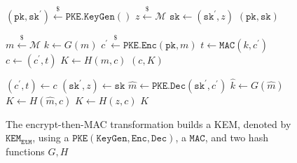 \documentclass[runningheads]{llncs}
\newcommand{\pke}{\texttt{PKE}}
\newcommand{\keygen}{\texttt{KeyGen}}
\newcommand{\encrypt}{\texttt{Enc}}
\newcommand{\decrypt}{\texttt{Dec}}
\newcommand{\kem}{\texttt{KEM}}
\newcommand{\encap}{\texttt{Encap}}
\newcommand{\decap}{\texttt{Decap}}
\newcommand{\etm}{\texttt{EtM}}  %
\newcommand{\mac}{\texttt{MAC}}
\newcommand{\pk}{\texttt{pk}}
\newcommand{\sk}{\texttt{sk}}
\newcommand{\leftsample}{\stackrel{\$}{\leftarrow}}
\begin{document}
\begin{figure}[H]
    \centering
    \begin{minipage}[t]{0.5\textwidth}
        \begin{algorithm}[H]
            \caption*{$\kem_\etm.\keygen()$}
            \begin{algorithmic}[1]
                \State $(\pk, \sk^\prime) \leftsample \pke\texttt{.}\keygen()$
                \State $z \leftsample \mathcal{M}$
                \State $\sk \leftarrow (\sk^\prime, z)$
                \State \Return $(\pk, \sk)$
            \end{algorithmic}
        \end{algorithm}
        \begin{algorithm}[H]
            \caption*{$\kem_\etm.\encap(\pk)$}
            \begin{algorithmic}[1]
                \State $m \leftsample \mathcal{M}$
                \State $k \leftarrow G(m)$
                \State $c^\prime \leftsample \pke\texttt{.}\encrypt(\pk, m)$
                \State $t \leftarrow \mac(k, c^\prime)$
                \State $c \leftarrow (c^\prime, t)$
                \State $K \leftarrow H(m, c)$
                \State \Return $(c, K)$
            \end{algorithmic}
        \end{algorithm}
    \end{minipage}\hfill
    \begin{minipage}[t]{0.49\textwidth}
        \begin{algorithm}[H]
            \caption*{$\kem_\etm.\decap(\sk, c)$}
            \begin{algorithmic}[1]
                \State $(c^\prime, t) \leftarrow c$
                \State $(\sk^\prime, z) \leftarrow \sk$
                \State $\hat{m} \leftarrow \pke\texttt{.}\decrypt(\sk^\prime, c^\prime)$
                \State $\hat{k} \leftarrow G(\hat{m})$
                \If{$\mac(\hat{k}, c^\prime) = t$}
                    \State $K \leftarrow H(\hat{m}, c)$
                \Else
                    \State $K \leftarrow H(z, c)$
                \EndIf
                \State \Return $K$
            \end{algorithmic}
        \end{algorithm}
    \end{minipage}
    \caption{The encrypt-then-MAC transformation builds a KEM, denoted by $\kem_\etm$, using a $\pke(\keygen, \encrypt, \decrypt)$, a $\mac$, and two hash functions $G, H$}\label{fig:etm-routines} 
\end{figure}
\end{document}
